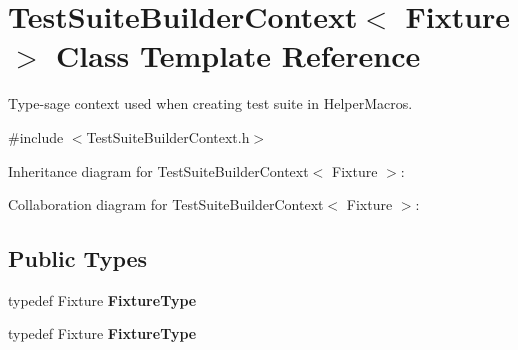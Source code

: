 \hypertarget{class_test_suite_builder_context}{\section{Test\+Suite\+Builder\+Context$<$ Fixture $>$ Class Template Reference}
\label{class_test_suite_builder_context}
}


Type-\/sage context used when creating test suite in Helper\+Macros.  




{\ttfamily \#include $<$Test\+Suite\+Builder\+Context.\+h$>$}



Inheritance diagram for Test\+Suite\+Builder\+Context$<$ Fixture $>$\+:


Collaboration diagram for Test\+Suite\+Builder\+Context$<$ Fixture $>$\+:
\subsection*{Public Types}
\begin{DoxyCompactItemize}
\item 
\hypertarget{class_test_suite_builder_context_a994528427c211ca187b39a9345ea53ee}{typedef Fixture {\bfseries Fixture\+Type}}\label{class_test_suite_builder_context_a994528427c211ca187b39a9345ea53ee}

\item 
\hypertarget{class_test_suite_builder_context_a994528427c211ca187b39a9345ea53ee}{typedef Fixture {\bfseries Fixture\+Type}}\label{class_test_suite_builder_context_a994528427c211ca187b39a9345ea53ee}

\end{DoxyCompactItemize}
